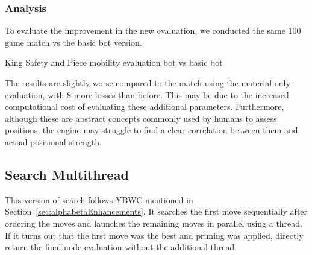 \subsubsection{Analysis}

To evaluate the improvement in the new evaluation, we conducted the same 100 game match vs the basic bot version.

\vspace{1em}

King Safety and Piece mobility evaluation bot vs basic bot\\
\medskip

\noindent The results are slightly worse compared to the match using the material-only evaluation, with 8 more losses than before. This may be due to the increased computational cost of evaluating these additional parameters. Furthermore, although these are abstract concepts commonly used by humans to assess positions, the engine may struggle to find a clear correlation between them and actual positional strength.

\subsection{Search Multithread}

This version of search follows YBWC mentioned in Section~\ref{sec:alphabetaEnhancements}. It searches the first move sequentially after ordering the moves and launches the remaining moves in parallel using a thread. If it turns out that the first move was the best and pruning was applied, directly return the final node evaluation without the additional thread.

